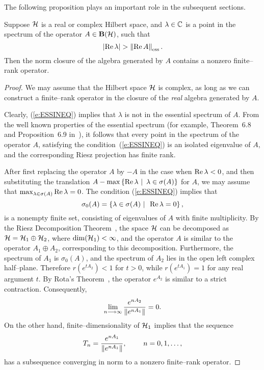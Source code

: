 The following proposition plays an important role in the subsequent sections.

\begin{prop}\label{p:ESSPECT}
Suppose ${\cal H}$ is a real or complex Hilbert space, and $\lambda\in\mathbb C$ is
a point in the spectrum of the operator $A\in\mathbf B(\cal H)$, such that
\begin{equation} \label{e:ESSINEQ}
 \abs{\RE\lambda} > \essnorm{\RE{}A}.
\end{equation}
Then the norm closure of the algebra generated by $A$ contains a nonzero
finite--rank operator.
\end{prop}

\begin{proof}
We may assume that the Hilbert space ${\cal H}$ is complex, as long as we can
construct a finite--rank operator in the closure of the {\em real} algebra
generated by $A$.

Clearly, (\ref{e:ESSINEQ}) implies that $\lambda$ is not in the essential
spectrum of $A$. From the well known properties of the essential spectrum
(for example, Theorem~6.8 and Proposition~6.9 in~\cite[p.~366]{Con90}), it
follows that every point in the spectrum of the operator $A$, satisfying the
condition~(\ref{e:ESSINEQ}) is an isolated eigenvalue of $A$, and the
corresponding Riesz projection has finite rank.

\goodbreak

After first replacing the operator $A$ by $-A$ in the case when
$\operatorname{Re}\lambda<0$, and then substituting the translation
$A-\max\left\{\operatorname{Re}\lambda\,\,|\,\,\,\lambda\in\sigma(A)\right\}$ for $A$, we may assume
that $\max_{\lambda\in\sigma(A)}{\operatorname{Re}\lambda}=0$. The condition
(\ref{e:ESSINEQ}) implies that
\[ \sigma_0(A)=\left\{\lambda\in\sigma(A)\,\,|\,\,\,\operatorname{Re}\lambda=0\right\}, \]
is a nonempty finite set, consisting of eigenvalues of $A$ with finite
multiplicity. By the Riesz Decomposition Theorem~\cite[p.~31]{RR73}, the
space ${\cal H}$ can be decomposed as ${\cal H}={\cal H}_1\oplus{\cal H}_2$, where
$\dim({\cal H}_1)<\infty$, and the operator $A$ is similar to the operator
$A_1\oplus{}A_2$, corresponding to this decomposition. Furthermore, the
spectrum of $A_1$ is $\sigma_0(A)$, and the spectrum of $A_2$ lies in the
open left complex half--plane. Therefore $r(e^{t{}A_2})<1$ for $t>0$, while
$r(e^{t{}A_1})=1$ for any real argument $t$. By Rota's
Theorem~\cite[p.~136]{Pau86}, the operator $e^{A_2}$ is similar to a strict
contraction. Consequently,
\[ \lim_{n\longrightarrow\infty}\frac{ e^{n{}A_2} }{ \left\Vert e^{n{}A_1}\right\Vert }=0. \]
On the other hand, finite--dimensionality of ${\cal H}_1$ implies that the sequence
\[ T_n = \frac{e^{n{}A_1}}{\left\Vert e^{n{}A_1}\right\Vert}, ~
         \qquad n=0,1,\ldots, \]
has a subsequence converging in norm to a nonzero finite--rank operator.
\end{proof}

